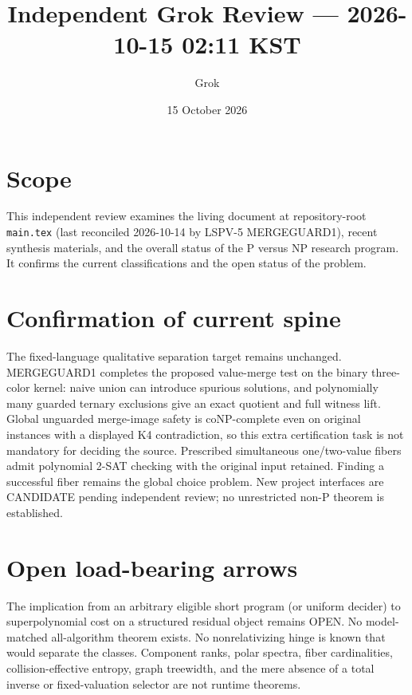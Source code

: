 \documentclass[11pt]{article}
\title{Independent Grok Review --- 2026-10-15 02:11 KST}
\author{Grok}
\date{15 October 2026}
\begin{document}
\maketitle

\begin{center}
\end{center}

\section{Scope}
This independent review examines the living document at repository-root \texttt{main.tex} (last reconciled 2026-10-14 by LSPV-5 MERGEGUARD1), recent synthesis materials, and the overall status of the P versus NP research program. It confirms the current classifications and the open status of the problem.

\section{Confirmation of current spine}
The fixed-language qualitative separation target remains unchanged. MERGEGUARD1 completes the proposed value-merge test on the binary three-color kernel: naive union can introduce spurious solutions, and polynomially many guarded ternary exclusions give an exact quotient and full witness lift. Global unguarded merge-image safety is coNP-complete even on original instances with a displayed K4 contradiction, so this extra certification task is not mandatory for deciding the source. Prescribed simultaneous one/two-value fibers admit polynomial 2-SAT checking with the original input retained. Finding a successful fiber remains the global choice problem. New project interfaces are CANDIDATE pending independent review; no unrestricted non-P theorem is established.

\section{Open load-bearing arrows}
The implication from an arbitrary eligible short program (or uniform decider) to superpolynomial cost on a structured residual object remains OPEN. No model-matched all-algorithm theorem exists. No nonrelativizing hinge is known that would separate the classes. Component ranks, polar spectra, fiber cardinalities, collision-effective entropy, graph treewidth, and the mere absence of a total inverse or fixed-valuation selector are not runtime theorems.
\end{document}
